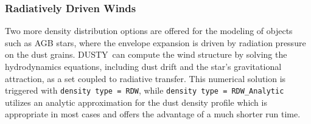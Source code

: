 \documentclass[11pt]{article}
\def\D    {{\sf DUSTY}}
\begin{document}
\subsubsection{Radiatively Driven Winds}
\label{winds}

Two more density distribution options are offered for the modeling of
objects such as AGB stars, where the envelope expansion is driven by
radiation pressure on the dust grains. \D\ can compute the wind
structure by solving the hydrodynamics equations, including dust drift
and the star's gravitational attraction, as a set coupled to radiative
transfer.  This numerical solution is triggered with {\tt density type
  = RDW}, while {\tt density type = RDW\_Analytic} utilizes an
analytic approximation for the dust density profile which is
appropriate in most cases and offers the advantage of a much shorter
run time.
\end{document}
